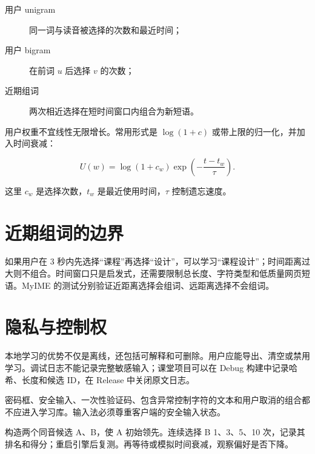\begin{description}
  \item[用户 unigram] 同一词与读音被选择的次数和最近时间；
  \item[用户 bigram] 在前词 \(u\) 后选择 \(v\) 的次数；
  \item[近期组词] 两次相近选择在短时间窗口内组合为新短语。
\end{description}

用户权重不宜线性无限增长。常用形式是 \(\log(1+c)\) 或带上限的归一化，并加入时间衰减：

\[
U(w)=\log(1+c_w)\exp\left(-\frac{t-t_w}{\tau}\right).
\]

这里 \(c_w\) 是选择次数，\(t_w\) 是最近使用时间，\(\tau\) 控制遗忘速度。



\section{近期组词的边界}

如果用户在 3 秒内先选择“课程”再选择“设计”，可以学习“课程设计”；时间距离过大则不组合。时间窗口只是启发式，还需要限制总长度、字符类型和低质量网页短语。MyIME 的测试分别验证近距离选择会组词、远距离选择不会组词。



\section{隐私与控制权}

本地学习的优势不仅是离线，还包括可解释和可删除。用户应能导出、清空或禁用学习。调试日志不能记录完整敏感输入；课堂项目可以在 Debug 构建中记录哈希、长度和候选 ID，在 Release 中关闭原文日志。

\begin{warningbox}[不要学习所有东西]
密码框、安全输入、一次性验证码、包含异常控制字符的文本和用户取消的组合都不应进入学习库。输入法必须尊重客户端的安全输入状态。
\end{warningbox}

\begin{lab}[个性化收敛]
构造两个同音候选 A、B，使 A 初始领先。连续选择 B 1、3、5、10 次，记录其排名和得分；重启引擎后复测。再等待或模拟时间衰减，观察偏好是否下降。
\end{lab}

